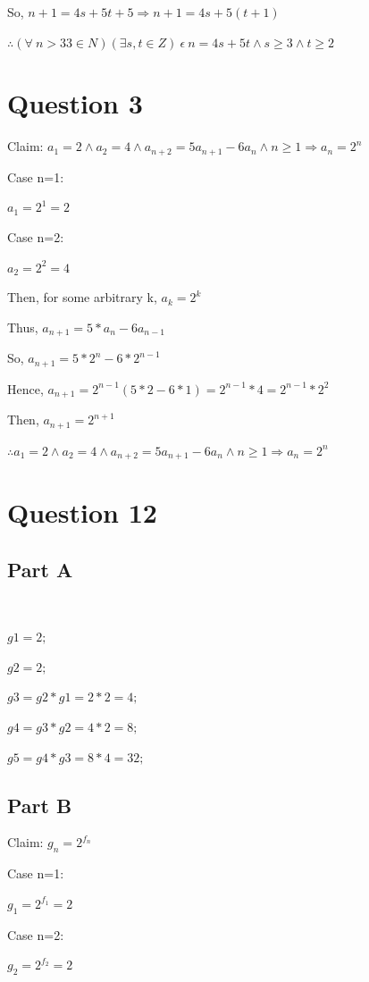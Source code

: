 \documentclass{article}
\begin{document}
So, $n+1=4s+5t+5 \Rightarrow n+1=4s+5(t+1)$

$\therefore (\forall \ n>33 \in N) (\exists s, t \in Z) \ \epsilon \ n=4s+5t \wedge s \geq 3 \wedge t \geq 2$

\section*{Question 3}

Claim: $a_1=2 \wedge a_2=4 \wedge a_{n+2}=5a_{n+1}-6a_n \wedge n \geq 1 \Rightarrow a_n=2^n$

Case n=1:

$a_1=2^1=2$

Case n=2: 

$a_2=2^2=4$

Then, for some arbitrary k, $a_k=2^k$

Thus, $a_{n+1}=5*a_n-6a_{n-1}$

So, $a_{n+1}=5*2^n-6*2^{n-1}$

Hence, $a_{n+1}=2^{n-1}(5*2-6*1)=2^{n-1}*4=2^{n-1}*2^2$

Then, $a_{n+1}=2^{n+1}$

$\therefore a_1=2 \wedge a_2=4 \wedge a_{n+2}=5a_{n+1}-6a_n \wedge n \geq 1 \Rightarrow a_n=2^n$



\section*{Question 12}
\subsection*{Part A}

\

$g1=2; \ $

$g2=2; \ $

$g3=g2*g1=2*2=4 ; \ $

$g4=g3*g2=4*2=8; \ $

$g5=g4*g3=8*4=32;$

\subsection*{Part B}

Claim: $g_n=2^{f_n}$

Case n=1: 

$g_1=2^{f_1}=2$

Case n=2:

$g_2=2^{f_2}=2$
\end{document}
